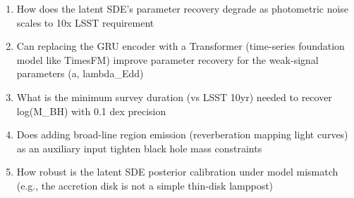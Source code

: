 \begin{enumerate}[leftmargin=1.6em,itemsep=0.2em,topsep=0.2em,label=Q\arabic*.]
\item How does the latent SDE's parameter recovery degrade as photometric noise scales to 10x LSST requirement
\item Can replacing the GRU encoder with a Transformer (time-series foundation model like TimesFM) improve parameter recovery for the weak-signal parameters (a, lambda\_Edd)
\item What is the minimum survey duration (vs LSST 10yr) needed to recover log(M\_BH) with 0.1 dex precision
\item Does adding broad-line region emission (reverberation mapping light curves) as an auxiliary input tighten black hole mass constraints
\item How robust is the latent SDE posterior calibration under model mismatch (e.g., the accretion disk is not a simple thin-disk lamppost)
\end{enumerate}

